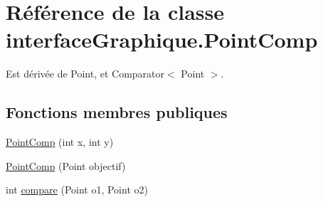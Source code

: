 \hypertarget{classinterface_graphique_1_1_point_comp}{\section{Référence de la classe interface\-Graphique.\-Point\-Comp}
\label{classinterface_graphique_1_1_point_comp}
}


Est dérivée de Point, et Comparator$<$ Point $>$.

\subsection*{Fonctions membres publiques}
\begin{DoxyCompactItemize}
\item 
\hyperlink{classinterface_graphique_1_1_point_comp_a445b387040f356ab15230221389ecddf}{Point\-Comp} (int x, int y)
\item 
\hyperlink{classinterface_graphique_1_1_point_comp_af60c856a56ce03b321d589f5d691ba8c}{Point\-Comp} (Point objectif)
\item 
int \hyperlink{classinterface_graphique_1_1_point_comp_aaaa8644250b70b34ee1a86da23e14a3a}{compare} (Point o1, Point o2)
\end{DoxyCompactItemize}


